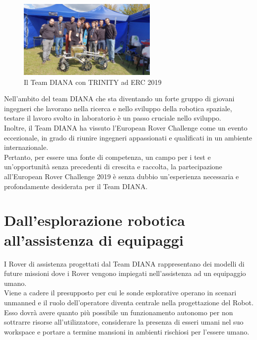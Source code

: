 \documentclass[%
corpo=11pt,
twoside,
 stile=classica,
oldstyle,
greek,%
]{toptesi}
\begin{document}
\begin{figure}
	\centering
	\includegraphics[width=0.6\textwidth]{image/trinityerc.jpeg}
	\caption{Il Team DIANA con TRINITY ad ERC 2019}
	\label{fig:trinityerc}
\end{figure}


Nell'ambito del team DIANA che sta diventando un forte gruppo di giovani ingegneri che lavorano nella ricerca e nello sviluppo della robotica spaziale, testare il lavoro svolto in laboratorio è un passo cruciale nello sviluppo.\\
Inoltre, il Team DIANA ha vissuto l'European Rover Challenge come un evento eccezionale, in grado di riunire ingegneri appassionati e qualificati in un ambiente internazionale.\\

Pertanto, per essere una fonte di competenza, un campo per i test e un'opportunità senza precedenti di crescita e raccolta, la partecipazione all'European Rover Challenge 2019 è senza dubbio un'esperienza necessaria e profondamente desiderata per il Team DIANA.\\

	\section{Dall'esplorazione robotica all'assistenza di equipaggi}
	I Rover di assistenza progettati dal Team DIANA rappresentano dei modelli di future missioni dove i Rover vengono impiegati nell'assistenza ad un equipaggio umano. \\
	Viene a cadere il presupposto per cui le sonde esplorative operano in scenari unmanned e il ruolo dell'operatore diventa centrale nella progettazione del Robot.\\
	 Esso dovrà avere quanto più possibile un funzionamento autonomo per non sottrarre risorse all'utilizzatore, considerare la presenza di esseri umani nel suo workspace e portare a termine mansioni in ambienti rischiosi per l'essere umano. 
	 
		
\end{document}
